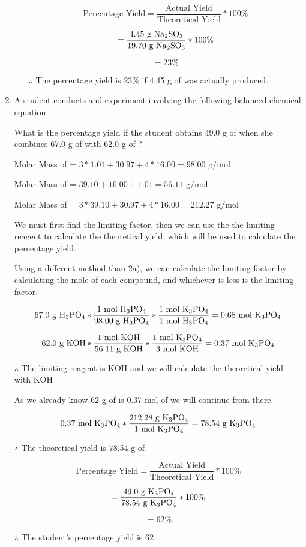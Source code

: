 \documentclass[10pt]{article}
\begin{document}
\begin{enumerate}
\begin{enumerate}
        $$\text{Percentage Yield}=\frac{\text{Actual Yield}}{\text{Theoretical Yield}}*100\%$$

        $$=\frac{4.45\text{ g }\ce{Na2SO3}}{19.70\text{ g }\ce{Na2SO3}}*100\%$$

        $$=23\%$$

        $\therefore$ The percentage yield is 23\% if 4.45 g of  was actually produced.
    \end{enumerate}
    \item A student conducts and experiment involving the following balanced chemical equation
    

    What is the percentage yield if the student obtains 49.0 g of  when she combines 67.0 g of  with 62.0 g of ?

    \bigskip

    Molar Mass of  = $3*1.01+30.97+4*16.00=98.00$ g/mol

    Molar Mass of  = $39.10+16.00+1.01=56.11$ g/mol

    Molar Mass of  = $3*39.10+30.97+4*16.00=212.27$ g/mol
    \medskip

    We must first find the limiting factor, then we can use the the limiting reagent to calculate the theoretical yield, which will be used to calculate the percentage yield.

    Using a different method than 2a), we can calculate the limiting factor by calculating the mole of each compound, and whichever is less is the limiting factor.
    
    $$67.0\text{ g }\ce{H3PO4}*\frac{1\text{ mol }\ce{H3PO4}}{98.00\text{ g }\ce{H3PO4}}*\frac{1\text{ mol }\ce{K3PO4}}{1\text{ mol }\ce{H3PO4}}=0.68\text{ mol }\ce{K3PO4}$$

    $$62.0\text{ g }\ce{KOH}*\frac{1\text{ mol }\ce{KOH}}{56.11\text{ g }\ce{KOH}}*\frac{1\text{ mol }\ce{K3PO4}}{3\text{ mol }\ce{KOH}}=0.37\text{ mol }\ce{K3PO4}$$

    $\therefore$ The limiting reagent is KOH and we will calculate the theoretical yield with KOH

    As we already know 62 g of  is 0.37 mol of  we will continue from there.

    $$0.37\text{ mol }\ce{K3PO4}*\frac{212.28\text{ g }\ce{K3PO4}}{1\text{ mol }\ce{K3PO4}}=78.54\text{ g }\ce{K3PO4}$$

    $\therefore$ The theoretical yield is 78.54 g of 

    $$\text{Percentage Yield}=\frac{\text{Actual Yield}}{\text{Theoretical Yield}}*100\%$$

    $$=\frac{49.0\text{ g }\ce{K3PO4}}{78.54\text{ g }\ce{K3PO4}}*100\%$$

    $$=62\%$$

    $\therefore$ The student's percentage yield is 62.
\end{enumerate}
\end{document}
